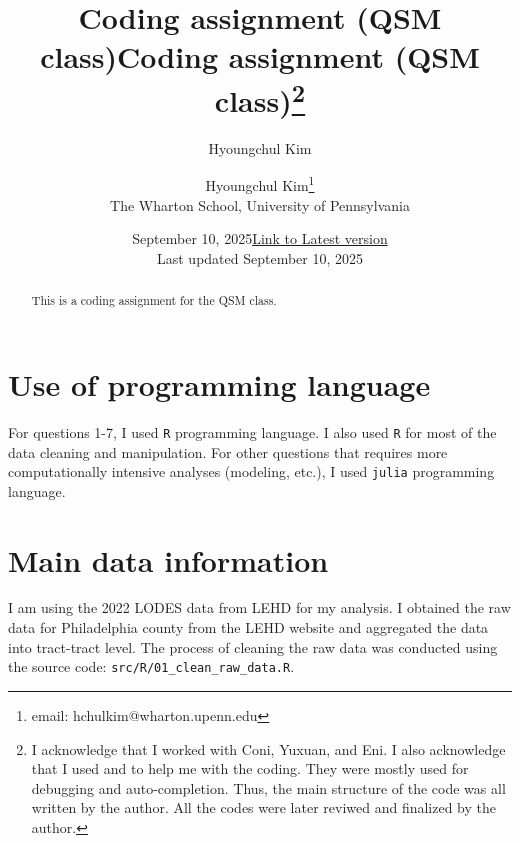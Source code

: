\documentclass[
  11pt]{article}
\title{Coding assignment (QSM class)}
\author{Hyoungchul Kim}
\date{September 10, 2025}
\begin{document}
\def\spacingset#1{\renewcommand{\baselinestretch}%
{#1}\small\normalsize} \spacingset{1}



\date{\href{https://github.com/hchulkim/qsm-class/blob/main/output/output.pdf}{Link to Latest version}\\ \vspace{1em}  Last updated September
10, 2025}
\title{Coding assignment (QSM class)\thanks{I acknowledge that I worked
with Coni, Yuxuan, and Eni. I also acknowledge that I used
\citet{chatgpt} and \citet{cursor} to help me with the coding. They were
mostly used for debugging and auto-completion. Thus, the main structure
of the code was all written by the author. All the codes were later
reviwed and finalized by the author.}}
\author{
Hyoungchul Kim\thanks{email: hchulkim@wharton.upenn.edu}\\
The Wharton School, University of Pennsylvania\\
}
\maketitle

\bigskip
\bigskip
\begin{abstract}
This is a coding assignment for the QSM class.
\end{abstract}

\bigskip

\newpage
\spacingset{1.2} %

\section{Use of programming
language}\label{sec-use-of-programming-language}

For questions 1-7, I used \texttt{R} programming language. I also used
\texttt{R} for most of the data cleaning and manipulation. For other
questions that requires more computationally intensive analyses
(modeling, etc.), I used \texttt{julia} programming language.

\section{Main data information}\label{sec-main-data-info}

I am using the 2022 LODES data from LEHD for my analysis. I obtained the
raw data for Philadelphia county from the LEHD website and aggregated
the data into tract-tract level. The process of cleaning the raw data
was conducted using the source code:
\texttt{src/R/01\_clean\_raw\_data.R}.
\end{document}
